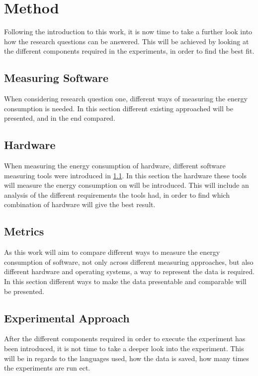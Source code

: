 \chapter{Method}\label{ch:method}

Following the introduction to this work, it is now time to take a further look into how the research questions can be answered. This will be achieved by looking at the different components required in the experiments, in order to find the best fit.

\section{Measuring Software}\label{sec:measuring_software}

When considering research question one, different ways of measuring the energy consumption is needed. In this section different existing approached will be presented, and in the end compared.







\section{Hardware}\label{sec:hardware}

When measuring the energy consumption of hardware, different software measuring tools were introduced in \cref{sec:measuring_software}. In this section the hardware these tools will measure the energy consumption on will be introduced. This will include an analysis of the different requirements the tools had, in order to find which combination of hardware will give the best result.

\section{Metrics}\label{sec:metrics}

As this work will aim to compare different ways to measure the energy consumption of software, not only across different measuring approaches, but also different hardware and operating systems, a way to represent the data is required. In this section different ways to make the data presentable and comparable will be presented.

\section{Experimental Approach}\label{sec:experimental_approach}

After the different components required in order to execute the experiment has been introduced, it is not time to take a deeper look into the experiment. This will be in regards to the languages used, how the data is saved, how many times the experiments are run ect.


